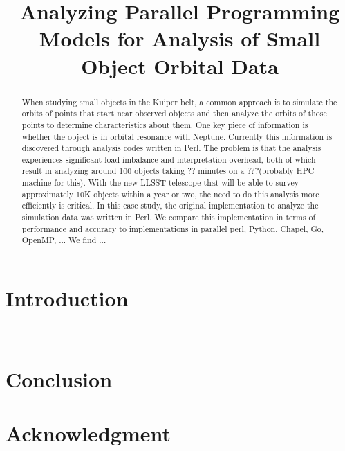 \documentclass[conference]{IEEEtran}
\begin{document}
\title{Analyzing Parallel Programming Models for Analysis of Small Object Orbital Data}


\author{
\and
{}
}

\maketitle

\begin{abstract}
When studying small objects in the Kuiper belt, a common approach is to simulate the orbits
of points that start near observed objects and then analyze the orbits of those points to determine
characteristics about them.  One key piece of information is whether the object is in orbital resonance
with Neptune.  Currently this information is discovered through analysis codes written
in Perl.  The problem is that the analysis experiences significant load imbalance and interpretation
overhead, both of which result in analyzing around 100 objects taking ?? minutes
on a ???(probably HPC machine for this).  With the new LLSST telescope that will be able
to survey approximately 10K objects within a year or two, the need to do this analysis
more efficiently is critical.
In this case study, the original implementation to analyze the simulation data was
written in Perl.  We compare this implementation in terms of performance and accuracy
to implementations in parallel perl, Python, Chapel, Go, OpenMP, ...
We find ...
\end{abstract}

\IEEEpeerreviewmaketitle


\section{Introduction}

~\cite{ChapelOverviewJan13}

\section{Conclusion}




\section*{Acknowledgment}




\end{document}
